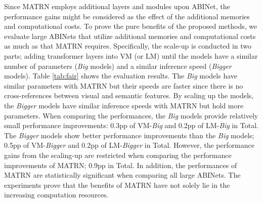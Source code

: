 \documentclass[runningheads]{llncs}
\begin{document}
Since MATRN employs additional layers and modules upon ABINet, the performance gains might be considered as the effect of the additional memories and computational costs. To prove the pure benefits of the proposed methods, we evaluate large ABINets that utilize additional memories and computational costs as much as that MATRN requires. Specifically, the scale-up is conducted in two parts; adding transformer layers into VM (or LM) until the models have a similar number of parameters (\textit{Big} models) and a similar inference speed (\textit{Bigger} models). 
Table \ref{tab:fair} shows the evaluation results. The \textit{Big} models have similar parameters with MATRN but their speeds are faster since there is no cross-references between visual and semantic features. By scaling up the models, the \textit{Bigger} models have similar inference speeds with MATRN but hold more parameters. When comparing the performances, the \textit{Big} models provide relatively small performance improvements: 0.3pp of VM-\textit{Big} and 0.2pp of LM-\textit{Big} in Total. The \textit{Bigger} models show better performance improvements than the \textit{Big} models; 0.5pp of VM-\textit{Bigger} and 0.2pp of LM-\textit{Bigger} in Total. However, the performance gains from the scaling-up are restricted when comparing the performance improvements of MATRN; 0.9pp in Total. In addition, the performances of MATRN are statistically significant when comparing all large ABINets. The experiments prove that the benefits of MATRN have not solely lie in the increasing computation resources.
\end{document}
